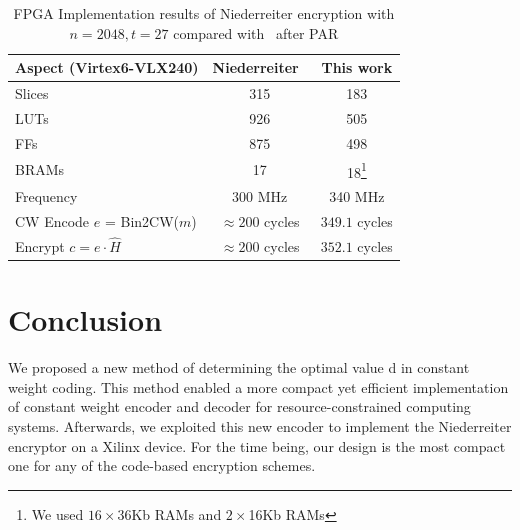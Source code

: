 \documentclass[10pt,journal,compsoc]{IEEEtran}
\begin{document}
 \begin{table}[!htb]\centering
 \renewcommand{\arraystretch}{1.4}
 \begin{minipage}{.5\textwidth}\centering
    \caption{FPGA Implementation results of Niederreiter encryption with $n=2048, t=27$ compared with~\cite{heyse2012towards} after PAR}
    \label{table:encryptor_result}
    \begin{tabular}{ l c c}
    \hline
         Aspect (Virtex6-VLX240) & Niederreiter~\cite{heyse2012towards} & \textbf{This work}  \\
    \hline
         Slices         & 315    & 183   \\
         LUTs           & 926   & 505 \\
         FFs            & 875   & 498 \\
         BRAMs          & 17    & 18\footnote[$\ast$]{We used $16\times$36Kb RAMs and $2\times$16Kb RAMs} \\
    \hline
        Frequency       & 300 MHz  &340 MHz \\
    \hline
    CW Encode $e$ = Bin2CW($m$) &     $\approx 200$ cycles          & $349.1$ cycles   \\
    Encrypt $c = e\cdot \hat{H}$ &    $\approx 200$ cycles           & $352.1$ cycles   \\
    \hline
    \end{tabular}
\end{minipage}
\end{table}

\section{Conclusion}
We proposed a new method of determining the optimal value d in constant weight coding.
This method enabled a more compact yet efficient implementation of constant weight encoder
and decoder for resource-constrained computing systems. Afterwards, we exploited
this new encoder to implement the Niederreiter encryptor on a Xilinx device.
For the time being, our design is the most compact one for any of the code-based encryption
schemes.



\end{document}
